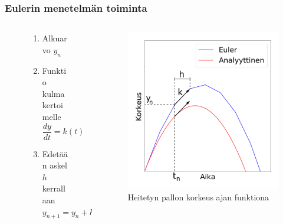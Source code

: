\documentclass[finnish, 11pt, fleqn]{beamer}
\begin{document}
\begin{frame}
	\frametitle{Eulerin menetelmän toiminta}
	\begin{columns}[onlytextwidth]
		\begin{column}{.45\textwidth}
			\begin{figure}
				\vspace{-4em}
    			\begin{enumerate}
    				\item{\small Alkuarvo \normalsize $y_n$}
    				\vspace{1em}
    				\item{\small Funktio kulmakertoimelle \normalsize $\dfrac{dy}{dt} = k(t)$}
					\vspace{1em}
    				\item{\small Edetään askel $h$ kerrallaan}
    				$y_{n+1} = y_n + h\,k(t_n)$
    			\end{enumerate}
			\end{figure}
		\end{column}
		\hfill
		\begin{column}{.55\textwidth}
			\begin{figure}[h!]
				\includegraphics[scale=0.25]{graphics/Euler_1.png}
				{\caption{Heitetyn pallon korkeus ajan funktiona}}
			\end{figure}
		\end{column}
	\end{columns}	
\end{frame}
\end{document}
